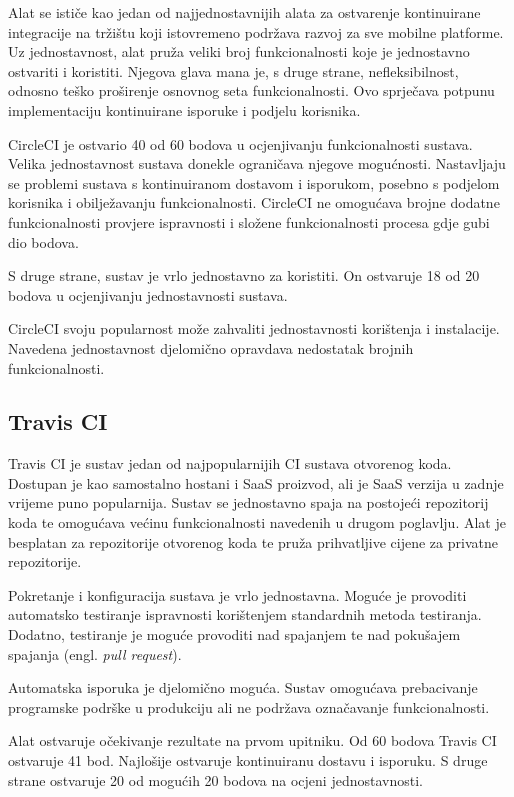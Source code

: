 \documentclass[times, utf8, diplomski, numeric]{fer}
\newcommand{\eng}[1]{(engl. \textit{#1})}
\begin{document}
\begin{appendices}
Alat se ističe kao jedan od najjednostavnijih alata za ostvarenje kontinuirane integracije na tržištu koji istovremeno podržava razvoj za sve mobilne platforme. Uz jednostavnost, alat pruža veliki broj funkcionalnosti koje je jednostavno ostvariti i koristiti. Njegova glava mana je, s druge strane, nefleksibilnost, odnosno teško proširenje osnovnog seta funkcionalnosti. Ovo sprječava potpunu implementaciju kontinuirane isporuke i podjelu korisnika.

CircleCI je ostvario 40 od 60 bodova u ocjenjivanju funkcionalnosti sustava. Velika jednostavnost sustava donekle ograničava njegove mogućnosti. Nastavljaju se problemi sustava s kontinuiranom dostavom i isporukom, posebno s podjelom korisnika i obilježavanju funkcionalnosti. CircleCI ne omogućava brojne dodatne funkcionalnosti provjere ispravnosti i složene funkcionalnosti procesa gdje gubi dio bodova.

S druge strane, sustav je vrlo jednostavno za koristiti. On ostvaruje 18 od 20 bodova u ocjenjivanju jednostavnosti sustava.

CircleCI svoju popularnost može zahvaliti jednostavnosti korištenja i instalacije. Navedena jednostavnost djelomično opravdava nedostatak brojnih funkcionalnosti.

\subsection{Travis CI}
Travis CI je sustav jedan od najpopularnijih CI sustava otvorenog koda. Dostupan je kao samostalno hostani i SaaS proizvod, ali je SaaS verzija u zadnje vrijeme puno popularnija. Sustav se jednostavno spaja na postojeći repozitorij koda te omogućava većinu funkcionalnosti navedenih u drugom poglavlju. Alat je besplatan za repozitorije otvorenog koda te pruža prihvatljive cijene za privatne repozitorije.

Pokretanje i konfiguracija sustava je vrlo jednostavna. Moguće je provoditi automatsko testiranje ispravnosti korištenjem standardnih metoda testiranja. Dodatno, testiranje je moguće provoditi nad spajanjem te nad pokušajem spajanja \eng{pull request}.

Automatska isporuka je djelomično moguća. Sustav omogućava prebacivanje programske podrške u produkciju ali ne podržava označavanje funkcionalnosti.

Alat ostvaruje očekivanje rezultate na prvom upitniku. Od 60 bodova Travis CI ostvaruje 41 bod. Najlošije ostvaruje kontinuiranu dostavu i isporuku. S druge strane ostvaruje 20 od mogućih 20 bodova na ocjeni jednostavnosti.


\end{appendices}
\end{document}

